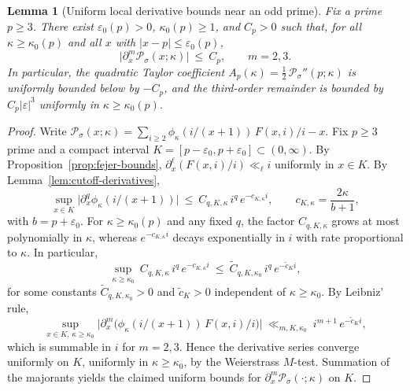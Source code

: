 \documentclass[11pt,a4paper]{amsart}
\theoremstyle{plain}
\newtheorem{lemma}[theorem]{Lemma}
\theoremstyle{definition}
\theoremstyle{remark}
\begin{document}
\begin{lemma}[Uniform local derivative bounds near an odd prime]\label{lem:uniform-local-sigma}
Fix a prime $p\ge 3$. There exist $\varepsilon_0(p)>0$, $\kappa_0(p)\ge 1$, and $C_p>0$ such that, for all $\kappa\ge \kappa_0(p)$ and all $x$ with $|x-p|\le \varepsilon_0(p)$,
\[
\bigl|\partial_x^{m}\mathcal P_\sigma(x;\kappa)\bigr|\ \le\ C_p,\qquad m=2,3.
\]
In particular, the quadratic Taylor coefficient $A_p(\kappa)=\tfrac12\,\mathcal P_\sigma''(p;\kappa)$ is uniformly bounded below by $-C_p$, and the third-order remainder is bounded by $C_p|\varepsilon|^{3}$ uniformly in $\kappa\ge \kappa_0(p)$.
\end{lemma}

\begin{proof}
Write $\mathcal P_\sigma(x;\kappa)=\sum_{i\ge 2}\phi_\kappa(i/(x+1))\,F(x,i)/i - x$. Fix $p\ge 3$ prime and a compact interval $K=[p-\varepsilon_0,p+\varepsilon_0]\subset(0,\infty)$. By Proposition~\ref{prop:fejer-bounds}, $\partial_x^\ell(F(x,i)/i)\ll_\ell i$ uniformly in $x\in K$. By Lemma~\ref{lem:cutoff-derivatives},
\[
\sup_{x\in K}\bigl|\partial_x^q\phi_\kappa(i/(x+1))\bigr|\ \le\ C_{q,K,\kappa}\,i^q\,e^{-c_{K,\kappa} i},\qquad c_{K,\kappa}=\frac{2\kappa}{b+1},
\]
with $b=p+\varepsilon_0$. For $\kappa\ge \kappa_0(p)$ and any fixed $q$, the factor $C_{q,K,\kappa}$ grows at most polynomially in $\kappa$, whereas $e^{-c_{K,\kappa} i}$ decays exponentially in $i$ with rate proportional to $\kappa$. In particular,
\[
\sup_{\kappa\ge \kappa_0}\ C_{q,K,\kappa}\,i^q\,e^{-c_{K,\kappa} i}\ \le\ \widetilde C_{q,K,\kappa_0}\,i^q\,e^{-\widetilde c_K i},
\]
for some constants $\widetilde C_{q,K,\kappa_0}>0$ and $\widetilde c_K>0$ independent of $\kappa\ge\kappa_0$. By Leibniz' rule,
\[
\sup_{x\in K,\,\kappa\ge\kappa_0}\bigl|\partial_x^{m}\!\bigl(\phi_\kappa(i/(x+1))\,F(x,i)/i\bigr)\bigr|\ \ll_{m,K,\kappa_0}\ i^{m+1}\,e^{-\widetilde c_K i},
\]
which is summable in $i$ for $m=2,3$. Hence the derivative series converge uniformly on $K$, uniformly in $\kappa\ge\kappa_0$, by the Weierstrass $M$-test. Summation of the majorants yields the claimed uniform bounds for $\partial_x^{m}\mathcal P_\sigma(\cdot;\kappa)$ on $K$.
\end{proof}
\end{document}
